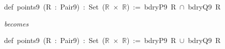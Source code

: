 {\footnotesize\ttfamily\setlength{\parindent}{0pt}\raggedright
\mbox{}def~points9~(R~:~Pair9)~:~Set~($\mathbb{R}$~$\times$~$\mathbb{R}$)~:=~bdryP9~R~$\cap$~bdryQ9~R\\[4pt]
}{\footnotesize\itshape becomes\\[4pt]}
{\footnotesize\ttfamily\setlength{\parindent}{0pt}\raggedright
\mbox{}def~points9~(R~:~Pair9)~:~Set~($\mathbb{R}$~$\times$~$\mathbb{R}$)~:=~bdryP9~R~$\cup$~bdryQ9~R
}

